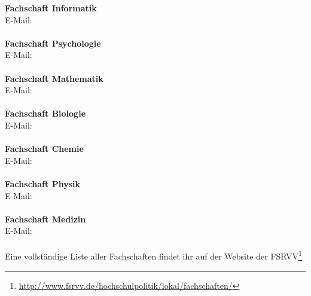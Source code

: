\textbf{Fachschaft Informatik}\\
E-Mail: \\
\\
\textbf{Fachschaft Psychologie}\\
E-Mail: \\
\\
\textbf{Fachschaft Mathematik}\\
E-Mail: \\
\\
\textbf{Fachschaft Biologie}\\
E-Mail: \\
\\
\textbf{Fachschaft Chemie}\\
E-Mail: \\
\\
\textbf{Fachschaft Physik}\\
E-Mail: \\
\\
\textbf{Fachschaft Medizin}\\
E-Mail: \\
\\
Eine vollständige Liste aller Fachschaften findet ihr auf der Website der FSRVV\footnote{\url{http://www.fsrvv.de/hochschulpolitik/lokal/fachschaften/}}

\vfill
